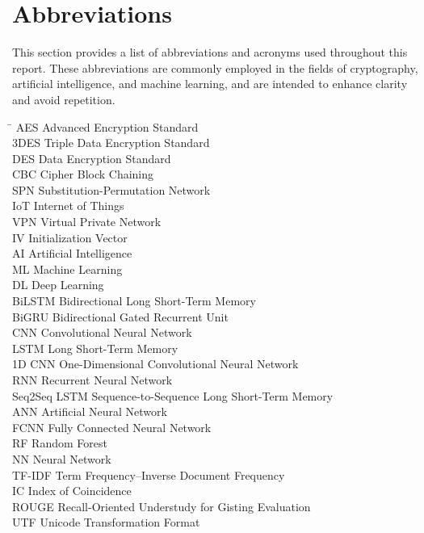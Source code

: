 \chapter*{Abbreviations}

This section provides a list of abbreviations and acronyms used throughout this report. These abbreviations are commonly employed in the fields of cryptography, artificial intelligence, and machine learning, and are intended to enhance clarity and avoid repetition.

\begin{tabbing}
  \hspace{3cm} \= \kill
  AES \> Advanced Encryption Standard \\
  3DES \> Triple Data Encryption Standard \\
  DES \> Data Encryption Standard \\
  CBC \> Cipher Block Chaining \\
  SPN \> Substitution-Permutation Network \\
  IoT \> Internet of Things \\
  VPN \> Virtual Private Network \\
  IV \> Initialization Vector \\
  AI \> Artificial Intelligence \\
  ML \> Machine Learning \\
  DL \> Deep Learning \\
  BiLSTM \> Bidirectional Long Short-Term Memory \\
  BiGRU \> Bidirectional Gated Recurrent Unit \\
  CNN \> Convolutional Neural Network \\
  LSTM \> Long Short-Term Memory \\
  1D CNN \> One-Dimensional Convolutional Neural Network \\
  RNN \> Recurrent Neural Network \\
  Seq2Seq LSTM \> Sequence-to-Sequence Long Short-Term Memory \\
  ANN \> Artificial Neural Network \\
  FCNN \> Fully Connected Neural Network \\
  RF \> Random Forest \\
  NN \> Neural Network \\
  TF-IDF \> Term Frequency–Inverse Document Frequency \\
  IC \> Index of Coincidence \\
  ROUGE \> Recall-Oriented Understudy for Gisting Evaluation \\
  UTF \> Unicode Transformation Format \\
\end{tabbing}
